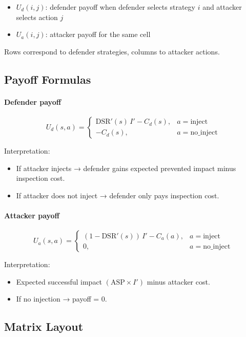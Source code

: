 \documentclass[12pt, a4paper]{report}
\begin{document}
\begin{itemize}
    \item $U_d(i,j)$: defender payoff when defender selects strategy $i$ and attacker selects action $j$
    \item $U_a(i,j)$: attacker payoff for the same cell
\end{itemize}

Rows correspond to defender strategies, columns to attacker actions.

\subsection*{Payoff Formulas}

\paragraph{Defender payoff}
\[
U_d(s,a)=
\begin{cases}
\mathrm{DSR}'(s)\, I' - C_d(s), & a=\text{inject} \\
-C_d(s), & a=\text{no\_inject}
\end{cases}
\]

Interpretation:
\begin{itemize}
    \item If attacker injects → defender gains expected prevented impact minus inspection cost.
    \item If attacker does not inject → defender only pays inspection cost.
\end{itemize}

\paragraph{Attacker payoff}
\[
U_a(s,a)=
\begin{cases}
(1-\mathrm{DSR}'(s))\, I' - C_a(a), & a=\text{inject} \\
0, & a=\text{no\_inject}
\end{cases}
\]

Interpretation:
\begin{itemize}
    \item Expected successful impact $(\text{ASP} \times I')$ minus attacker cost.
    \item If no injection → payoff = 0.
\end{itemize}

\subsection*{Matrix Layout}
\end{document}
